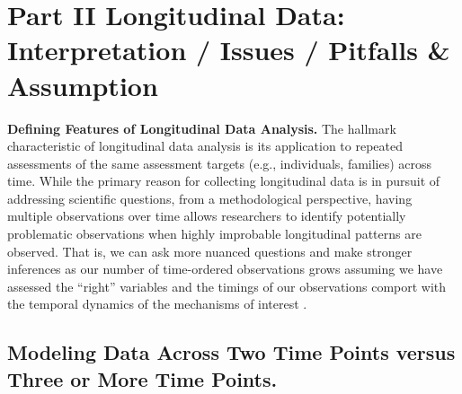 \documentclass[
  letterpaper,
  DIV=11,
  numbers=noendperiod]{scrartcl}
\begin{document}
\hypertarget{part-ii-longitudinal-data-interpretation-issues-pitfalls-assumption}{%
\section{Part II Longitudinal Data: Interpretation / Issues / Pitfalls
\&
Assumption}\label{part-ii-longitudinal-data-interpretation-issues-pitfalls-assumption}}

\label{sec:headings} \textbf{Defining Features of Longitudinal Data
Analysis.} The hallmark characteristic of longitudinal data analysis is
its application to repeated assessments of the same assessment targets
(e.g., individuals, families) across time. While the primary reason for
collecting longitudinal data is in pursuit of addressing scientific
questions, from a methodological perspective, having multiple
observations over time allows researchers to identify potentially
problematic observations when highly improbable longitudinal patterns
are observed. That is, we can ask more nuanced questions and make
stronger inferences as our number of time-ordered observations grows
assuming we have assessed the ``right'' variables and the timings of our
observations comport with the temporal dynamics of the mechanisms of
interest .

\hypertarget{modeling-data-across-two-time-points-versus-three-or-more-time-points.}{%
\subsection{Modeling Data Across Two Time Points versus Three or More
Time
Points.}\label{modeling-data-across-two-time-points-versus-three-or-more-time-points.}}
\end{document}
